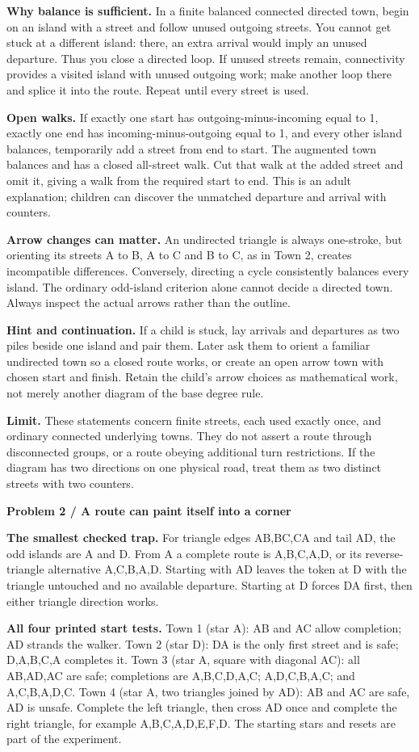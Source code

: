 \documentclass[11pt]{article}
\newcommand{\parttitle}[1]{{\large\bfseries\color{ink}#1}\par}
\newcommand{\labelled}[2]{\textbf{#1} #2\par}
\begin{document}
\labelled{Why balance is sufficient.}{In a finite balanced connected directed town, begin on an island with a street and follow unused outgoing streets. You cannot get stuck at a different island: there, an extra arrival would imply an unused departure. Thus you close a directed loop. If unused streets remain, connectivity provides a visited island with unused outgoing work; make another loop there and splice it into the route. Repeat until every street is used.}
\labelled{Open walks.}{If exactly one start has outgoing-minus-incoming equal to 1, exactly one end has incoming-minus-outgoing equal to 1, and every other island balances, temporarily add a street from end to start. The augmented town balances and has a closed all-street walk. Cut that walk at the added street and omit it, giving a walk from the required start to end. This is an adult explanation; children can discover the unmatched departure and arrival with counters.}
\labelled{Arrow changes can matter.}{An undirected triangle is always one-stroke, but orienting its streets A to B, A to C and B to C, as in Town 2, creates incompatible differences. Conversely, directing a cycle consistently balances every island. The ordinary odd-island criterion alone cannot decide a directed town. Always inspect the actual arrows rather than the outline.}
\labelled{Hint and continuation.}{If a child is stuck, lay arrivals and departures as two piles beside one island and pair them. Later ask them to orient a familiar undirected town so a closed route works, or create an open arrow town with chosen start and finish. Retain the child's arrow choices as mathematical work, not merely another diagram of the base degree rule.}
\labelled{Limit.}{These statements concern finite streets, each used exactly once, and ordinary connected underlying towns. They do not assert a route through disconnected groups, or a route obeying additional turn restrictions. If the diagram has two directions on one physical road, treat them as two distinct streets with two counters.}
\newpage
\parttitle{Problem 2 / A route can paint itself into a corner}
\labelled{The smallest checked trap.}{For triangle edges AB,BC,CA and tail AD, the odd islands are A and D. From A a complete route is A,B,C,A,D, or its reverse-triangle alternative A,C,B,A,D. Starting with AD leaves the token at D with the triangle untouched and no available departure. Starting at D forces DA first, then either triangle direction works.}
\labelled{All four printed start tests.}{Town 1 (star A): AB and AC allow completion; AD strands the walker. Town 2 (star D): DA is the only first street and is safe; D,A,B,C,A completes it. Town 3 (star A, square with diagonal AC): all AB,AD,AC are safe; completions are A,B,C,D,A,C; A,D,C,B,A,C; and A,C,B,A,D,C. Town 4 (star A, two triangles joined by AD): AB and AC are safe, AD is unsafe. Complete the left triangle, then cross AD once and complete the right triangle, for example A,B,C,A,D,E,F,D. The starting stars and resets are part of the experiment.}
\end{document}
